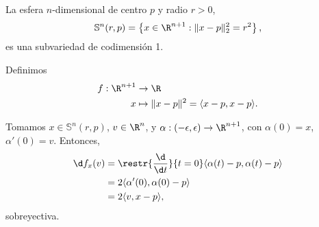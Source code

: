 \begin{ejemplo} \label{ejemplo:esfera}
  La esfera $n$-dimensional de centro $p$ y radio $r>0$,
  \[
    \mathbb{S}^{n}(r,p) = \left\{ x\in\R^{n+1} : \|x-p\|_{2}^{2} = r^{2} \right\}
  ,\] es una subvariedad de codimensión 1.

    Definimos
      \begin{alignat*}{2}
      f: \R^{n+1} & \to  \R \\
          x & \mapsto  \|x-p\|^{2} = \langle x-p,x-p \rangle.
      \end{alignat*}

    Tomamos $x\in\mathbb{S}^{n}(r,p)$, $v\in\R^{n}$, y $\alpha:
    (-\epsilon,\epsilon)\to\R^{n+1}$, con $\alpha(0)=x$, $\alpha'(0) = v$.
    Entonces,
      \begin{align*}
      \d f_{x}(v) &= \restr{\frac{\d}{\d t}}{t=0} \langle \alpha(t) -
                    p,\alpha(t) - p \rangle \\
                  &= 2\langle \alpha'(0), \alpha(0) - p \rangle \\
        &= 2\langle v, x-p \rangle,
      \end{align*}
  sobreyectiva.
\end{ejemplo}
